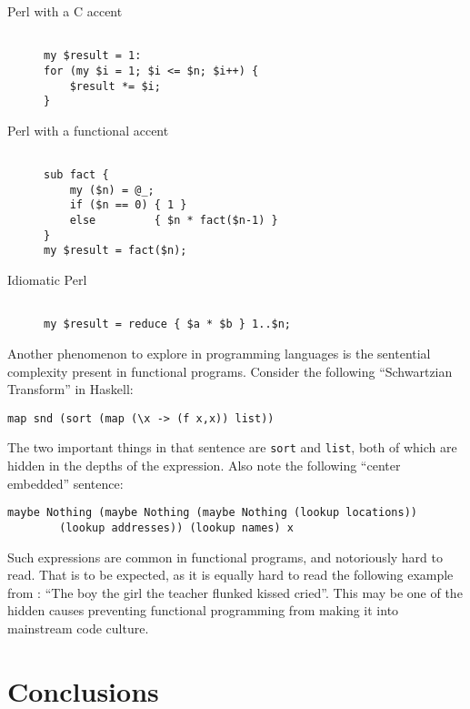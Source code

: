 \documentclass[12pt]{article}
\begin{document}
\begin{description}
\item[Perl with a C accent]
\begin{verbatim}

my $result = 1:
for (my $i = 1; $i <= $n; $i++) {
    $result *= $i;
}
\end{verbatim}

\item[Perl with a functional accent] 
\begin{verbatim}

sub fact {
    my ($n) = @_;
    if ($n == 0) { 1 }
    else         { $n * fact($n-1) }
}
my $result = fact($n);
\end{verbatim}

\item[Idiomatic Perl]
\begin{verbatim}

my $result = reduce { $a * $b } 1..$n;
\end{verbatim}
\end{description}

Another phenomenon to explore in programming languages is the sentential
complexity present in functional programs.  Consider the following
``Schwartzian Transform'' in Haskell:

\begin{verbatim}
map snd (sort (map (\x -> (f x,x)) list))
\end{verbatim}

The two important things in that sentence are \texttt{sort} and
\texttt{list}, both of which are hidden in the depths of the
expression.  Also note the following ``center embedded''
sentence:

\begin{verbatim}
maybe Nothing (maybe Nothing (maybe Nothing (lookup locations)) 
        (lookup addresses)) (lookup names) x
\end{verbatim}

Such expressions are common in functional programs, and notoriously hard
to read.  That is to be expected, as it is equally hard to read the
following example from \cite{Abe-Hatasa-Cowan-1988}: ``The boy the girl
the teacher flunked kissed cried''.  This may be one of the hidden
causes preventing functional programming from making it into mainstream
code culture.

\section{Conclusions}
\end{document}
